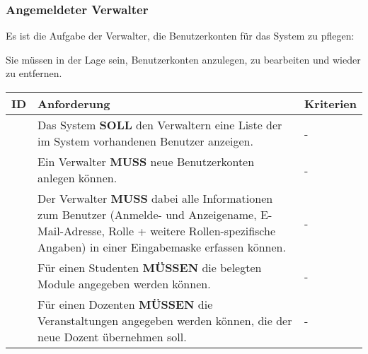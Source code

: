 \vspace{12pt}

\subsubsection{Angemeldeter Verwalter}
Es ist die Aufgabe der Verwalter, die Benutzerkonten für das System zu pflegen:

Sie müssen in der Lage sein, Benutzerkonten anzulegen, zu bearbeiten und wieder zu entfernen.

\vspace{12pt}

\begin{tabular} {|p{}|p{}|p{}|}
	\hline
	ID & Anforderung & Kriterien \\
	\hline
	\printfreqnr
	& Das System \textbf{SOLL} den Verwaltern eine Liste der im System vorhandenen Benutzer anzeigen.
	& - \\ 
	\hline
	\printfreqnr
	& Ein Verwalter \textbf{MUSS} neue Benutzerkonten anlegen können. 
	& - \\
	\hline
	\printfreqnr
	& Der Verwalter \textbf{MUSS} dabei alle Informationen zum Benutzer (Anmelde- und Anzeigename, E-Mail-Adresse, Rolle + weitere Rollen-spezifische Angaben) in einer Eingabemaske erfassen können.
	& - \\ 
	\hline
	\printfreqnr
	& Für einen Studenten \textbf{MÜSSEN} die belegten Module angegeben werden können.
	& - \\ 
	\hline
	\printfreqnr
	& Für einen Dozenten \textbf{MÜSSEN} die Veranstaltungen angegeben werden können, die der neue Dozent übernehmen soll.
	& - \\ 
	\hline
\end{tabular}

\newpage

